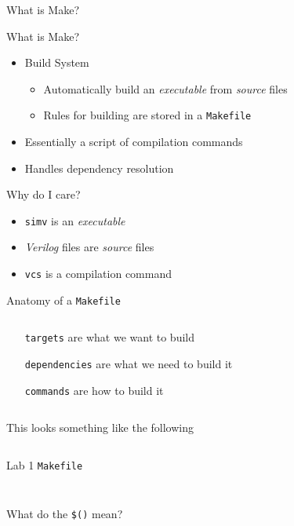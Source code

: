\documentclass[dvipsnames]{beamer}
\begin{document}
\begin{frame}{What is Make?}
	\begin{block}{What is Make?}
		\begin{itemize}
			\item Build System
				\begin{itemize}
					\item Automatically build an \emph{executable} from
						\emph{source} files
					\item Rules for building are stored in a \texttt{Makefile}
				\end{itemize}
			\item Essentially a script of compilation commands
			\item Handles dependency resolution
		\end{itemize}
	\end{block}
	\pause
	\begin{block}{Why do I care?}
		\pause
		\begin{itemize}
			\item \texttt{simv} is an \emph{executable}
			\item \emph{Verilog} files are \emph{source} files
			\item \texttt{vcs} is a compilation command
		\end{itemize}
	\end{block}
\end{frame}

\begin{frame}{Anatomy of a \texttt{Makefile}}
	\begin{columns}
		\begin{column}[c]{0.70\textwidth}
			\begin{itemize}
				\item[\texttt{targets}] are what we want to build
				\item[\texttt{dependencies}] are what we need to build it
				\item[\texttt{commands}] are how to build it 
			\end{itemize}
		\end{column}
	\end{columns}
	\begin{block}{}	
		This looks something like the following
		\inputminted[fontsize=\scriptsize,frame=lines]{makefile}{scripts/Makefile.example}
	\end{block}
\end{frame}

\begin{frame}{Lab 1 \texttt{Makefile}}
	\inputminted[fontsize=\scriptsize,frame=lines,firstline=33,lastline=34,fontsize=\scriptsize]{makefile}{scripts/Makefile} 
	\inputminted[fontsize=\scriptsize,frame=lines,firstline=41,lastline=45,fontsize=\scriptsize]{makefile}{scripts/Makefile}

	What do the \texttt{\$()} mean?
\end{frame}
\end{document}

